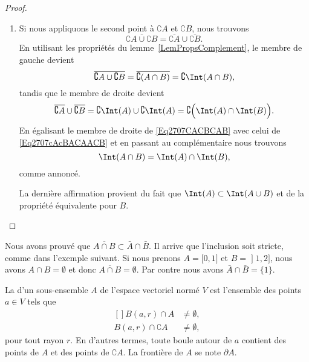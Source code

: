 \begin{proof}
\begin{enumerate}
		\item
		      Si nous appliquons le second point à \( \complement A\) et \( \complement B\), nous trouvons
		      \begin{equation}
			      \overline{ \complement A\cup\complement B }=\overline{ \complement A}\cup\overline{ \complement B}.
		      \end{equation}
		      En utilisant les propriétés du lemme~\ref{LemPropsComplement}, le membre de gauche devient
		      \begin{equation}	\label{Eq2707CACBCAB}
			      \overline{ \complement A\cup\complement B }=\overline{ \complement(A\cap B) }=\complement\Int(A\cap B),
		      \end{equation}
		      tandis que le membre de droite devient
		      \begin{equation}		\label{Eq2707cAcBACAACB}
			      \overline{ \complement A }\cup\overline{ \complement B }=\complement\Int(A)\cup\complement\Int(A)=\complement\Big( \Int(A)\cap\Int(B) \Big).
		      \end{equation}
		      En égalisant le membre de droite de \eqref{Eq2707CACBCAB} avec celui de \eqref{Eq2707cAcBACAACB} et en passant au complémentaire nous trouvons
		      \begin{equation}
			      \Int(A\cap B)=\Int(A)\cap\Int(B),
		      \end{equation}
		      comme annoncé.

		      La dernière affirmation provient du fait que \( \Int(A)\subset\Int(A\cup B)\) et de la propriété équivalente pour \( B\).
	\end{enumerate}
\end{proof}

\begin{remark}
	Nous avons prouvé que \( \overline{ A\cap B }\subset\bar A\cap\bar B\). Il arrive que l'inclusion soit stricte, comme dans l'exemple suivant. Si nous prenons \( A=\mathopen[ 0 , 1 \mathclose]\) et \( B=\mathopen] 1 , 2 \mathclose]\), nous avons \( A\cap B=\emptyset\) et donc \( \overline{ A\cap B }=\emptyset\). Par contre nous avons \( \bar A\cap\bar B=\{ 1 \}\).
\end{remark}

\begin{definition}
	La  d'un sous-ensemble \( A\) de l'espace vectoriel normé \( V\) est l'ensemble des points \( a\in V\) tels que
	\begin{equation}
		\begin{aligned}[]
			B(a,r)\cap A             & \neq \emptyset, \\
			B(a,r)\cap \complement A & \neq \emptyset,
		\end{aligned}
	\end{equation}
	pour tout rayon \( r\). En d'autres termes, toute boule autour de \( a\) contient des points de \( A\) et des points de \( \complement A\). La frontière de \( A\) se note \( \partial A\).
\end{definition}


